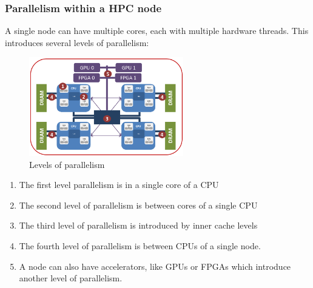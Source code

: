 \subsubsection{Parallelism within a HPC node}

A single node can have multiple cores, each with multiple hardware threads. This introduces several levels of parallelism:

\begin{figure}[H]
    \centering
    \includegraphics[width=0.6\textwidth]{assets/parallelism.png}
    \caption{Levels of parallelism}
    \label{fig:parallelism}
\end{figure}

\begin{enumerate}
    \item The first level parallelism is in a single core of a CPU
    \item The second level of parallelism is between cores of a single CPU
    \item The third level of parallelism is introduced by inner cache levels
    \item The fourth level of parallelism is between CPUs of a single node.
    \item A node can also have accelerators, like GPUs or FPGAs which introduce another level of parallelism.
\end{enumerate}
